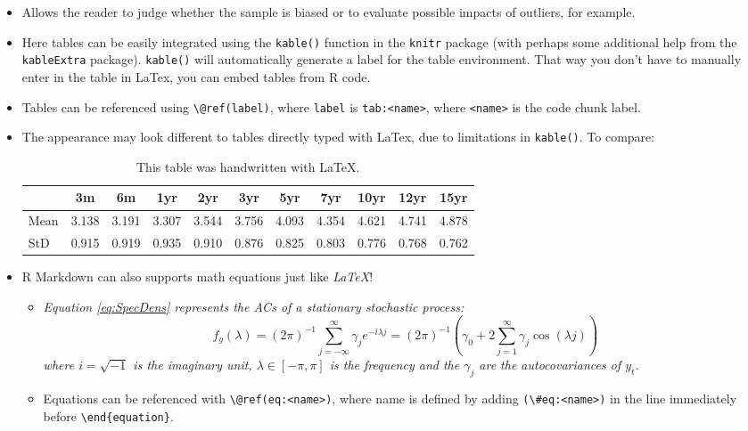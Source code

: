 \documentclass[a4paper,11pt]{article}
\begin{document}
\begin{itemize}
\item
  Allows the reader to judge whether the sample is biased or to evaluate
  possible impacts of outliers, for example.
\item
  Here tables can be easily integrated using the \texttt{kable()} function in the
  \texttt{knitr} package (with perhaps some additional help from the \texttt{kableExtra}
  package). \texttt{kable()} will automatically generate a label for the table
  environment. That way you don't have to manually enter in the table in LaTex,
  you can embed tables from R code.
\item
  Tables can be referenced using \texttt{\textbackslash{}@ref(label)}, where \texttt{label} is \texttt{tab:\textless{}name\textgreater{}},
  where \texttt{\textless{}name\textgreater{}} is the code chunk label.
\item
  The appearance may look different to tables directly typed with LaTex, due to
  limitations in \texttt{kable()}. To compare:
  \begin{table}[ht]
    \begin{center}
        {\footnotesize
        \begin{tabular}{l|cccccccccc}
            \hline \hline
                      & 3m    & 6m    & 1yr   & 2yr   & 3yr   & 5yr   & 7yr   & 10yr  & 12yr  & 15yr   \\
            \hline
                Mean   & 3.138 & 3.191 & 3.307 & 3.544 & 3.756 & 4.093 & 4.354 & 4.621 & 4.741 & 4.878  \\
                StD    & 0.915 & 0.919 & 0.935 & 0.910 & 0.876 & 0.825 & 0.803 & 0.776 & 0.768 & 0.762  \\
            \hline \hline
        \end{tabular}}
    \end{center}
    \caption{This table was handwritten with LaTeX.}
    \label{tab:table2}
    \end{table}
\item
  R Markdown can also supports math equations just like \emph{LaTeX}!
  \begin{itemize}
  \item
    \emph{Equation \eqref{eq:SpecDens} represents the ACs of a stationary
    stochastic process:}
    \begin{equation}
            f_y(\lambda) = (2\pi)^{-1} \sum_{j=-\infty}^{\infty}
                           \gamma_j e^{-i\lambda j}
                         =(2\pi)^{-1}\left(\gamma_0 + 2 \sum_{j=1}^{\infty}
        \gamma_j \cos(\lambda j)\right)
                                       \label{eq:SpecDens}
    \end{equation}
    \emph{where \(i=\sqrt{-1}\) is the imaginary unit, \(\lambda \in [-\pi, \pi]\) is the
    frequency and the \(\gamma_j\) are the autocovariances of \(y_t\).}
  \item
    Equations can be referenced with \texttt{\textbackslash{}@ref(eq:\textless{}name\textgreater{})}, where name is defined
    by adding \texttt{(\textbackslash{}\#eq:\textless{}name\textgreater{})} in the line immediately before \texttt{\textbackslash{}end\{equation\}}.
  \end{itemize}
\end{itemize}
\end{document}
